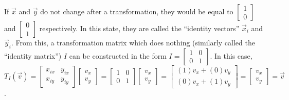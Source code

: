 \documentclass[12pt, a4paper]{article}
\begin{document}
If $\vec{x}$ and $\vec{y}$ do not change after a transformation, they would be
equal to $\begin{bmatrix} 1 \\ 0 \end{bmatrix}$ and $\begin{bmatrix} 0 \\ 1
\end{bmatrix}$ respectively. In this state, they are called the ``identity
vectors'' $\vec{x}_i$ and $\vec{y}_i$. From this, a transformation matrix which
does nothing (similarly called the ``identity matrix'') $I$ can be constructed in the form
$
    I = \begin{bmatrix}
        1 & 0 \\
        0 & 1
    \end{bmatrix}
$. In this case, $
T_{I}(\vec{v}) 
= \begin{bmatrix}
    x_{ix} & y_{ix} \\
    x_{iy} & y_{iy}
\end{bmatrix}
\begin{bmatrix}
    v_x \\
    v_y
\end{bmatrix}
= \begin{bmatrix}
   1 & 0 \\
   0 & 1
\end{bmatrix}
\begin{bmatrix}
    v_x \\
    v_y
\end{bmatrix}
= \begin{bmatrix}
        (1)v_x + (0)v_y \\
        (0)v_x + (1)v_y 
\end{bmatrix}
= \begin{bmatrix}
    v_x \\
    v_y
\end{bmatrix} 
= \vec{v}$. \\\\

\pagebreak
\end{document}
